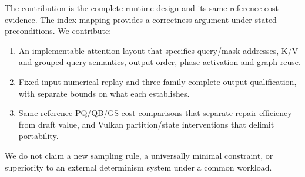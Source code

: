The contribution is the complete runtime design and its same-reference cost evidence. The index mapping provides a correctness argument under stated preconditions. We contribute:
\begin{enumerate}[label=(\arabic*),topsep=3pt]
\item An implementable attention layout that specifies query/mask addresses, K/V and grouped-query semantics, output order, phase activation and graph reuse.
\item Fixed-input numerical replay and three-family complete-output qualification, with separate bounds on what each establishes.
\item Same-reference PQ/QB/GS cost comparisons that separate repair efficiency from draft value, and Vulkan partition/state interventions that delimit portability.
\end{enumerate}
We do not claim a new sampling rule, a universally minimal constraint, or superiority to an external determinism system under a common workload.
